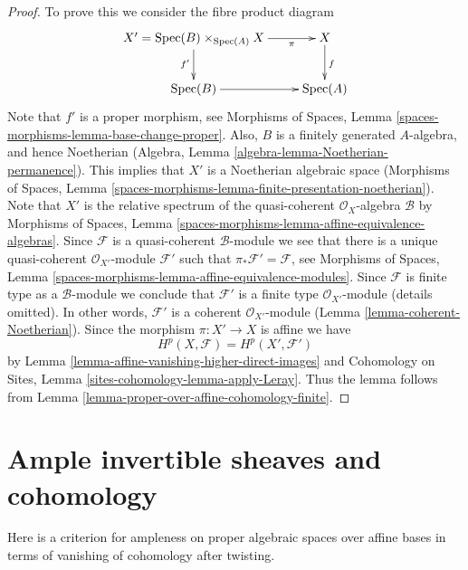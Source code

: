 \documentclass{stacks-project}
\theoremstyle{plain}
\theoremstyle{definition}
\theoremstyle{remark}
\numberwithin{equation}{subsection}
\def\Spec{\mathop{\mathrm{Spec}}}
\begin{document}
\begin{proof}
To prove this we consider the fibre product diagram
$$
\xymatrix{
X' = \Spec(B) \times_{\Spec(A)} X
\ar[r]_-\pi \ar[d]_{f'} &
X \ar[d]^f \\
\Spec(B) \ar[r] &
\Spec(A)
}
$$
Note that $f'$ is a proper morphism, see
Morphisms of Spaces, Lemma \ref{spaces-morphisms-lemma-base-change-proper}.
Also, $B$ is a finitely generated $A$-algebra, and hence
Noetherian (Algebra, Lemma \ref{algebra-lemma-Noetherian-permanence}).
This implies that $X'$ is a Noetherian algebraic space
(Morphisms of Spaces, Lemma
\ref{spaces-morphisms-lemma-finite-presentation-noetherian}).
Note that $X'$ is the relative spectrum of the quasi-coherent
$\mathcal{O}_X$-algebra $\mathcal{B}$ by
Morphisms of Spaces, Lemma
\ref{spaces-morphisms-lemma-affine-equivalence-algebras}.
Since $\mathcal{F}$ is a quasi-coherent $\mathcal{B}$-module
we see that there is a unique quasi-coherent
$\mathcal{O}_{X'}$-module $\mathcal{F}'$ such that
$\pi_*\mathcal{F}' = \mathcal{F}$, see
Morphisms of Spaces, Lemma
\ref{spaces-morphisms-lemma-affine-equivalence-modules}.
Since $\mathcal{F}$ is finite type as a $\mathcal{B}$-module we
conclude that $\mathcal{F}'$ is a finite type
$\mathcal{O}_{X'}$-module (details omitted). In other words,
$\mathcal{F}'$ is a coherent $\mathcal{O}_{X'}$-module
(Lemma \ref{lemma-coherent-Noetherian}).
Since the morphism $\pi : X' \to X$ is affine we have
$$
H^p(X, \mathcal{F}) = H^p(X', \mathcal{F}')
$$
by
Lemma \ref{lemma-affine-vanishing-higher-direct-images}
and
Cohomology on Sites, Lemma \ref{sites-cohomology-lemma-apply-Leray}.
Thus the lemma follows from
Lemma \ref{lemma-proper-over-affine-cohomology-finite}.
\end{proof}









\section{Ample invertible sheaves and cohomology}
\label{section-ample-cohomology}

\noindent
Here is a criterion for ampleness on proper algebraic spaces over affine bases
in terms of vanishing of cohomology after twisting.
\end{document}
